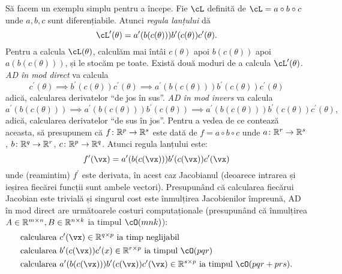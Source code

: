 \documentclass[../../book-main_ro.tex]{subfiles}
\begin{document}
Să facem un exemplu simplu pentru a începe. Fie \(\cL\) definită de \(\cL = a \circ b \circ c\) unde \(a, b, c\) sunt diferențiabile. Atunci \textit{regula lanțului} dă
\begin{equation}
    \cL^{\prime}(\theta) = a^{\prime}(b(c(\theta)))b^{\prime}(c(\theta))c^{\prime}(\theta).
\end{equation}
Pentru a calcula \(\cL(\theta)\), calculăm mai întâi \(c(\theta)\) apoi \(b(c(\theta))\) apoi \(a(b(c(\theta)))\), și le stocăm pe toate. Există două moduri de a calcula \(\cL^{\prime}(\theta)\). \textit{AD în mod direct} va calcula
\begin{equation}
    c^{\prime}(\theta) \implies b^{\prime}(c(\theta))c^{\prime}(\theta) \implies a^{\prime}(b(c(\theta)))b^{\prime}(c(\theta))c^{\prime}(\theta)
\end{equation}
adică, calcularea derivatelor ``de jos în sus''. \textit{AD în mod invers} va calcula
\begin{equation}
    a^{\prime}(b(c(\theta))) \implies a^{\prime}(b(c(\theta)))b^{\prime}(c(\theta)) \implies a^{\prime}(b(c(\theta)))b^{\prime}(c(\theta))c^{\prime}(\theta),
\end{equation}
adică, calcularea derivatelor ``de sus în jos''. Pentru a vedea de ce contează aceasta, să presupunem că \(f \colon \mathbb{R}^{p} \to \mathbb{R}^{s}\) este dată de \(f = a \circ b \circ c\) unde \(a \colon \mathbb{R}^{r} \to \mathbb{R}^{s}\), \(b \colon \mathbb{R}^{q} \to \mathbb{R}^{r}\), \(c \colon \mathbb{R}^{p} \to \mathbb{R}^{q}\). Atunci regula lanțului este:
\begin{equation}
    f^{\prime}(\vx) = a^{\prime}(b(c(\vx)))b^{\prime}(c(\vx))c^{\prime}(\vx)
\end{equation}
unde (reamintim) \(f^{\prime}\) este derivata, în acest caz Jacobianul (deoarece intrarea și ieșirea fiecărei funcții sunt ambele vectori). Presupunând că calcularea fiecărui Jacobian este trivială și singurul cost este înmulțirea Jacobienilor împreună, AD în mod direct are următoarele costuri computaționale (presupunând că înmulțirea \(A \in \mathbb{R}^{m \times n}, B \in \mathbb{R}^{n \times k}\) ia timpul \(\cO(mnk)\)):
\begin{align}
    &\text{calcularea}\ c^{\prime}(\vx) \in \R^{q \times p}\ \text{ia timp neglijabil} \\
    &\text{calcularea}\ b^{\prime}(c(\vx))c^{\prime}(x) \in \R^{r \times p}\ \text{ia timpul \(\cO(pqr)\)} \\
    &\text{calcularea}\ a^{\prime}(b(c(\vx)))b^{\prime}(c(\vx))c^{\prime}(\vx) \in \R^{s \times p}\ \text{ia timpul \(\cO(pqr + prs)\).}
\end{align}
\end{document}
